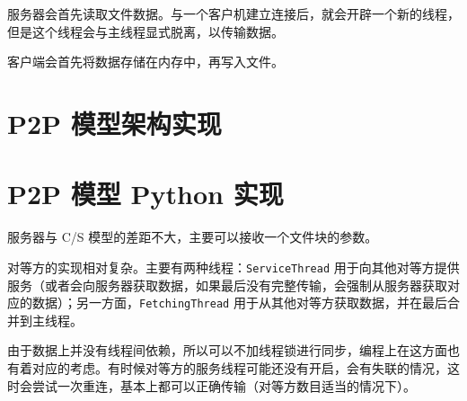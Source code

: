 
服务器会首先读取文件数据。与一个客户机建立连接后，就会开辟一个新的线程，但是这个线程会与主线程显式脱离，以传输数据。


客户端会首先将数据存储在内存中，再写入文件。

\section{P2P 模型架构实现}\label{sec:p2pcentralized}


\section{P2P 模型 Python 实现 \faPython}\label{sec:p2ppy}

服务器与 C/S 模型的差距不大，主要可以接收一个文件块的参数。


对等方的实现相对复杂。主要有两种线程：\verb"ServiceThread" 用于向其他对等方提供服务（或者会向服务器获取数据，如果最后没有完整传输，会强制从服务器获取对应的数据）；另一方面，\verb"FetchingThread" 用于从其他对等方获取数据，并在最后合并到主线程。

由于数据上并没有线程间依赖，所以可以不加线程锁进行同步，编程上在这方面也有着对应的考虑。有时候对等方的服务线程可能还没有开启，会有失联的情况，这时会尝试一次重连，基本上都可以正确传输（对等方数目适当的情况下）。


